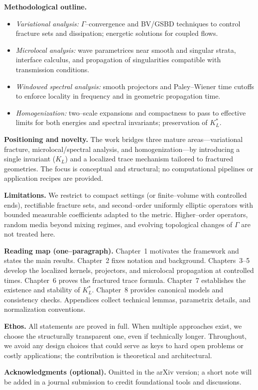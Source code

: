 \medskip
\textbf{Methodological outline.}
\begin{itemize}[leftmargin=7mm]
  \item \emph{Variational analysis:} $\Gamma$–convergence and BV/GSBD techniques to control fracture sets and dissipation; energetic solutions for coupled flows.
  \item \emph{Microlocal analysis:} wave parametrices near smooth and singular strata, interface calculus, and propagation of singularities compatible with transmission conditions.
  \item \emph{Windowed spectral analysis:} smooth projectors and Paley–Wiener time cutoffs to enforce locality in frequency and in geometric propagation time.
  \item \emph{Homogenization:} two–scale expansions and compactness to pass to effective limits for both energies and spectral invariants; preservation of $K_L^\ast$.
\end{itemize}

\medskip
\textbf{Positioning and novelty.}
The work bridges three mature areas—variational fracture, microlocal/spectral analysis, and homogenization—by introducing a single invariant ($K_L$) and a localized trace mechanism tailored to fractured geometries. The focus is conceptual and structural; no computational pipelines or application recipes are provided.

\medskip
\textbf{Limitations.}
We restrict to compact settings (or finite–volume with controlled ends), rectifiable fracture sets, and second–order uniformly elliptic operators with bounded measurable coefficients adapted to the metric. Higher–order operators, random media beyond mixing regimes, and evolving topological changes of $\Gamma$ are not treated here.

\medskip
\textbf{Reading map (one–paragraph).}
Chapter~1 motivates the framework and states the main results. Chapter~2 fixes notation and background. Chapters~3–5 develop the localized kernels, projectors, and microlocal propagation at controlled times. Chapter~6 proves the fractured trace formula. Chapter~7 establishes the existence and stability of $K_L^\ast$. Chapter~8 provides canonical models and consistency checks. Appendices collect technical lemmas, parametrix details, and normalization conventions.

\medskip
\textbf{Ethos.}
All statements are proved in full. When multiple approaches exist, we choose the structurally transparent one, even if technically longer. Throughout, we avoid any design choices that could serve as keys to hard open problems or costly applications; the contribution is theoretical and architectural.

\medskip
\textbf{Acknowledgments (optional).}
Omitted in the arXiv version; a short note will be added in a journal submission to credit foundational tools and discussions.
